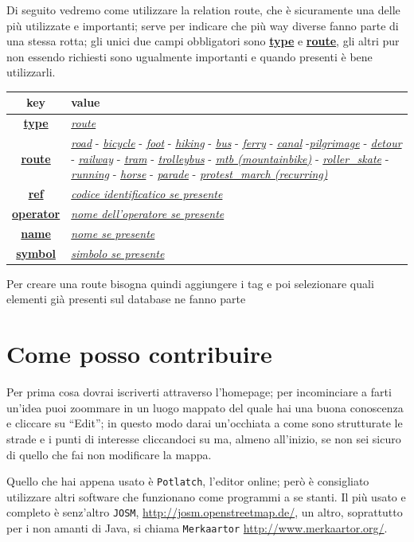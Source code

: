 \documentclass[a4paper,twoside,12pt,]{article}
\newcommand{\key}[1]{\underline{\textbf{#1}}}
\newcommand{\val}[1]{\underline{\textit{#1}}}
\begin{document}
Di seguito vedremo come utilizzare la relation route, che è sicuramente una delle più utilizzate e importanti; serve per indicare che più way diverse fanno parte di una stessa rotta; gli unici due campi obbligatori sono \key{type} e \key{route}, gli altri pur non essendo richiesti sono ugualmente importanti e quando presenti è bene utilizzarli.
\begin{center}
 \begin{tabular}{cp{9cm}}
  \toprule
   \textbf{key} & \textbf{value} \\
  \midrule
   \key{type} & \val{route} \\
   \key{route} & \val{road} - \val{bicycle} - \val{foot} - \val{hiking} - \val{bus} - \val{ferry} - \val{canal} -\val{pilgrimage} - \val{detour} - \val{railway} - \val{tram} - \val{trolleybus} - \val{mtb (mountainbike)} - \val{roller\_skate} - \val{running} - \val{horse} - \val{parade} - \val{protest\_march (recurring)} \\
   \key{ref} & \val{codice identificatico se presente}\\
   \key{operator} & \val{nome dell'operatore se presente} \\
   \key{name} & \val{nome se presente} \\
   \key{symbol} & \val{simbolo se presente} \\
  \bottomrule
\end{tabular}
\end{center}
Per creare una route bisogna quindi aggiungere i tag e poi selezionare quali elementi già presenti sul database ne fanno parte

\section{Come posso contribuire}
Per prima cosa dovrai iscriverti attraverso l'homepage; per incominciare a farti un'idea puoi zoommare in un luogo mappato del quale hai una buona conoscenza e cliccare su ``Edit''; in questo modo darai un'occhiata a come sono strutturate le strade e i punti di interesse cliccandoci su ma, almeno all'inizio, se non sei sicuro di quello che fai non modificare la mappa.

Quello che hai appena usato è \texttt{Potlatch}, l'editor online; però è consigliato utilizzare altri software che funzionano come programmi a se stanti. Il più usato e completo è senz'altro \texttt{JOSM}, \url{http://josm.openstreetmap.de/}, un altro, soprattutto per i non amanti di Java, si chiama \texttt{Merkaartor} \url{http://www.merkaartor.org/}.
\end{document}

